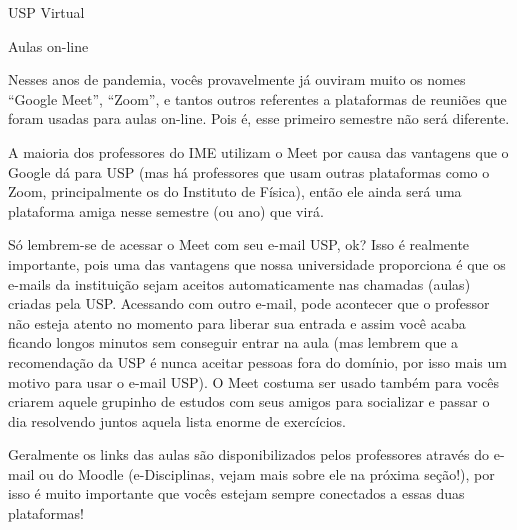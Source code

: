 \begin{secao}{USP Virtual}


\begin{subsecao}{Aulas on-line}

Nesses anos de pandemia, vocês provavelmente já ouviram muito os nomes ``Google
Meet'', ``Zoom'', e tantos outros referentes a plataformas de reuniões que foram
usadas para aulas on-line. Pois é, esse primeiro semestre não será diferente.

A maioria dos professores do IME utilizam o Meet por causa das vantagens que
o Google dá para USP (mas há professores que usam outras plataformas como o Zoom,
principalmente os do Instituto de Física), então ele ainda será uma plataforma
amiga nesse semestre (ou ano) que virá.

Só lembrem-se de acessar o Meet com seu e-mail USP, ok? Isso é realmente importante,
pois uma das vantagens que nossa universidade proporciona é que os e-mails da
instituição sejam aceitos automaticamente nas chamadas (aulas) criadas pela USP.
Acessando com outro e-mail, pode acontecer que o professor não esteja atento no
momento para liberar sua entrada e assim você acaba ficando longos minutos sem
conseguir entrar na aula (mas lembrem que a recomendação da USP é nunca aceitar pessoas
fora do domínio, por isso mais um motivo para usar o e-mail USP). O Meet costuma ser
usado também para vocês criarem aquele grupinho de estudos com seus amigos para socializar
e passar o dia resolvendo juntos aquela lista enorme de exercícios.

Geralmente os links das aulas são disponibilizados pelos professores através do
e-mail ou do Moodle (e-Disciplinas, vejam mais sobre ele na próxima seção!),
por isso é muito importante que vocês estejam sempre conectados a essas duas plataformas!


\end{subsecao}
\end{secao}
